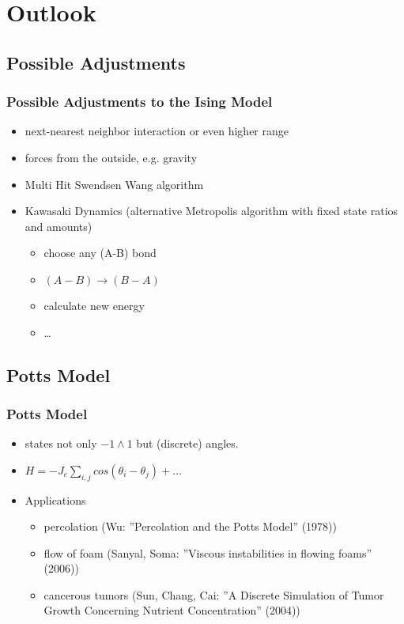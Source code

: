 \documentclass{beamer}
\begin{document}

\section{Outlook}\subsection{Possible Adjustments}
\begin{frame}
\frametitle{Possible Adjustments to the Ising Model}
\begin{itemize}
\item next-nearest neighbor interaction or even higher range
\item forces from the outside, e.g. gravity
\item Multi Hit Swendsen Wang algorithm
\item Kawasaki Dynamics (alternative Metropolis algorithm with fixed state ratios and amounts)\begin{itemize}
\item choose any (A-B) bond
\item $(A-B) \rightarrow (B-A)$
\item calculate new energy
\item \ldots
\end{itemize}
\end{itemize}
\end{frame}
\subsection{Potts Model}
\begin{frame}
\frametitle{Potts Model}
\begin{itemize}
\item states not only $-1 \land 1$ but (discrete) angles.
\item $H = -J_c \sum_{i,j}cos\left(\theta_i -\theta_j\right) +  \ldots$
\item Applications
\begin{itemize}
\item percolation (Wu: ''Percolation and the Potts Model'' (1978))
\item flow of foam (Sanyal, Soma: ''Viscous instabilities in flowing foams'' (2006))
\item cancerous tumors (Sun, Chang, Cai: ''A Discrete Simulation of Tumor Growth Concerning Nutrient Concentration'' (2004))
\end{itemize}
\end{itemize}
\end{frame}
\end{document}
